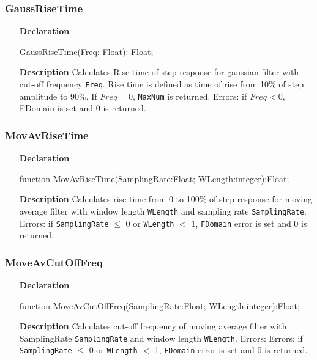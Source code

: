 \documentclass[12pt,a4paper,oneside]{report}
\newcommand{\declarationitem}[1]{\textbf{#1}}
\newcommand{\descriptiontitle}[1]{\textbf{#1}}
\newcommand{\code}[1]{\texttt{#1}}
\begin{document}
\subsubsection{GaussRiseTime}
\label{ufilters-gaussrisetime}
\begin{itemize}
	\item[\declarationitem{Declaration}\hfill]
	\begin{flushleft}
		GaussRiseTime(Freq: Float): Float;	
	\end{flushleft}
	\item[\descriptiontitle{Description}]
	Calculates Rise time of step response for gaussian filter with cut-off frequency \code{Freq}. Rise time is defined as time of rise from 10\% of step amplitude to 90\%. If $Freq = 0$, \code{MaxNum} is returned. Errors: if $Freq < 0$, FDomain is set and 0 is returned. 
\end{itemize}	
\subsubsection{MovAvRiseTime}
\label{ufilters-movavrisetime}
\begin{itemize}
	\item[\declarationitem{Declaration}\hfill]
	\begin{flushleft}
	function MovAvRiseTime(SamplingRate:Float; WLength:integer):Float;	
	\end{flushleft}
	\item[\descriptiontitle{Description}]
	Calculates rise time from 0 to 100\% of step response for moving average filter with window length \code{WLength} and sampling rate \code{SamplingRate}. Errors: if \code{SamplingRate} $\leq$ 0 or \code{WLength} $<$ 1, \code{FDomain} error is set and 0 is returned.
\end{itemize}	
\subsubsection{MoveAvCutOffFreq}
\label{ufilters-moveavcutofffreq}
\begin{itemize}
	\item[\declarationitem{Declaration}\hfill]
	\begin{flushleft}
function MoveAvCutOffFreq(SamplingRate:Float; WLength:integer):Float;		
	\end{flushleft}
	\item[\descriptiontitle{Description}]
	Calculates cut-off frequency of moving average filter with SamplingRate \code{SamplingRate} and window length \code{WLength}. Errors: Errors: if \code{SamplingRate} $\leq$ 0 or \code{WLength} $<$ 1, \code{FDomain} error is set and 0 is returned.
\end{itemize}	
\end{document}
